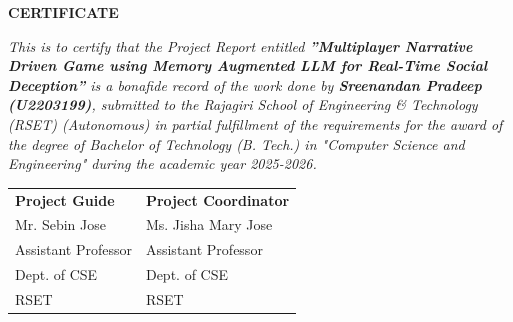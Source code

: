 	\newpage
	\thispagestyle{empty}
	\vspace{1cm}
	\begin{center}
	
		\large \bfseries{\huge{CERTIFICATE}}\\[1cm]
	\end{center}
	
	\renewcommand{\baselinestretch}{1.2}\normalsize
	
	\emph{This is to certify that the Project Report entitled \textbf{”Multiplayer Narrative Driven Game using Memory
Augmented LLM for Real-Time Social Deception”} is a bonafide record of the work done by 
\textbf{Sreenandan Pradeep (U2203199)},
submitted to the Rajagiri School of Engineering \& Technology (RSET) (Autonomous) in partial fulfillment of the requirements for the award of the degree of Bachelor of Technology (B. Tech.) in "Computer Science and Engineering" during the academic year 2025-2026.}\\[2.5cm]
	
\begin{flushleft}
	
	
	\begin{longtable}{p{10.8cm} p{10.8cm}}
        {\textbf{Project Guide}} &  {\textbf{Project Coordinator}}\\
		{Mr. Sebin Jose} & {Ms. Jisha Mary Jose}\\
		{Assistant Professor} & {Assistant Professor}\\
		{Dept. of CSE} & {Dept. of CSE}\\
		{RSET} & {RSET} \\
		
	\end{longtable}
\end{flushleft}
	
